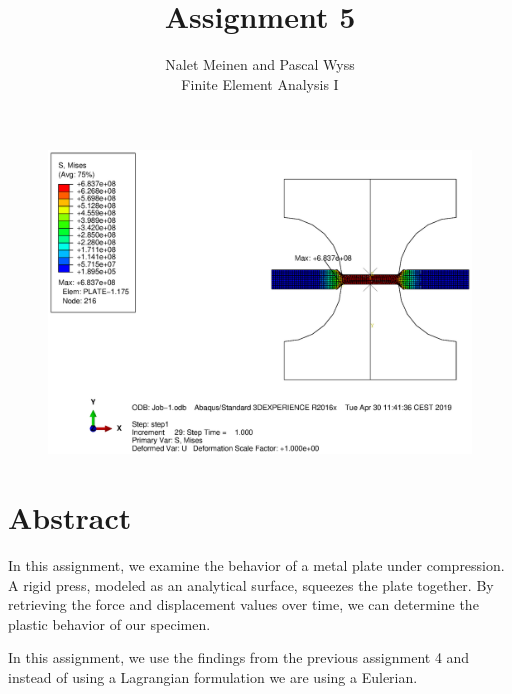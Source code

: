 \documentclass[12pt]{article}
\begin{document}


\title{Assignment 5}%
\author{Nalet Meinen and Pascal Wyss\\ %
Finite Element Analysis I
}
\maketitle

\begin{figure}[!htb]
  \centering
  \vspace*{1cm}
  \includegraphics[trim={10cm 4cm 12cm 1cm},clip,width=1.0\linewidth]{pics/titelbild}
  \label{fig:0}
\end{figure}

\newpage

\section*{Abstract}
In this assignment, we examine the behavior of a metal plate under compression.
A rigid press, modeled as an analytical surface, squeezes the plate together.
By retrieving the force and displacement values over time, we can determine the plastic behavior of our specimen.

In this assignment, we use the findings from the previous assignment 4 and instead of using a Lagrangian 
formulation we are using a Eulerian.
\end{document}
